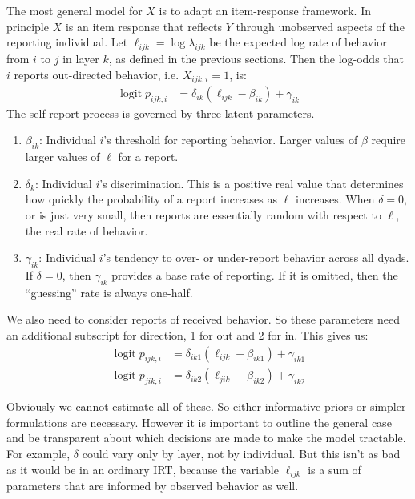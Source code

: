 \documentclass[reqno ,12pt]{amsart}
\DeclareMathOperator{\logit}{logit}
\begin{document}
The most general model for $X$ is to adapt an item-response framework. In principle $X$ is an item response that reflects $Y$ through unobserved aspects of the reporting individual. Let $\ell_{ijk} = \log \lambda_{ijk}$ be the expected log rate of behavior from $i$ to $j$ in layer $k$, as defined in the previous sections. Then the log-odds that $i$ reports out-directed behavior, i.e. $X_{ijk,i}=1$, is:
\begin{align*}
\logit p_{ijk,i} &= \delta_{ik} ( \ell_{ijk} - \beta_{ik} ) + \gamma_{ik}
\end{align*}
The self-report process is governed by three latent parameters.
\begin{enumerate}
\item $\beta_{ik}$: Individual $i$'s threshold for reporting behavior. Larger values of $\beta$ require larger values of $\ell$ for a report.
\item $\delta_{k}$: Individual $i$'s discrimination. This is a positive real value that determines how quickly the probability of a report increases as $\ell$ increases. When $\delta=0$, or is just very small, then reports are essentially random with respect to $\ell$, the real rate of behavior.
\item $\gamma_{ik}$: Individual $i$'s tendency to over- or under-report behavior across all dyads. If $\delta=0$, then $\gamma_{ik}$ provides a base rate of reporting. If it is omitted, then the ``guessing'' rate is always one-half.
\end{enumerate}
We also need to consider reports of received behavior. So these parameters need an additional subscript for direction, 1 for out and 2 for in. This gives us:
\begin{align*}
\logit p_{ijk,i} &= \delta_{ik1} ( \ell_{ijk} - \beta_{ik1} ) + \gamma_{ik1}\\
\logit p_{jik,i} &= \delta_{ik2} ( \ell_{jik} - \beta_{ik2} ) + \gamma_{ik2}
\end{align*}

Obviously we cannot estimate all of these. So either informative priors or simpler formulations are necessary. However it is important to outline the general case and be transparent about which decisions are made to make the model tractable. For example, $\delta$ could vary only by layer, not by individual. But this isn't as bad as it would be in an ordinary IRT, because the variable $\ell_{ijk}$ is a sum of parameters that are informed by observed behavior as well. 

%
%
\end{document}
